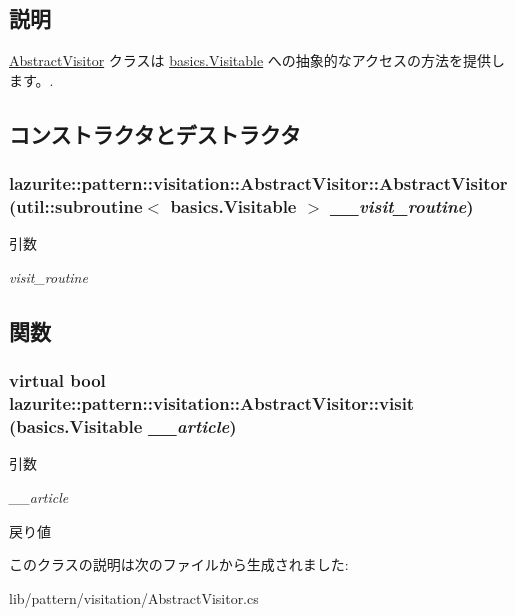 \subsection{説明}
\hyperlink{classlazurite_1_1pattern_1_1visitation_1_1_abstract_visitor}{AbstractVisitor} クラスは \hyperlink{interfacelazurite_1_1pattern_1_1basics_1_1_visitable}{basics.Visitable} への抽象的なアクセスの方法を提供します。. 

\subsection{コンストラクタとデストラクタ}
\hypertarget{classlazurite_1_1pattern_1_1visitation_1_1_abstract_visitor_afaf79739e852e350b1860ca72323355f}{
\subsubsection[{AbstractVisitor}]{\setlength{\rightskip}{0pt plus 5cm}lazurite::pattern::visitation::AbstractVisitor::AbstractVisitor (util::subroutine$<$ {\bf basics.Visitable} $>$ {\em \_\-\_\-visit\_\-routine})}}
\label{classlazurite_1_1pattern_1_1visitation_1_1_abstract_visitor_afaf79739e852e350b1860ca72323355f}

\begin{DoxyParams}{引数}
\item[{\em visit\_\-routine}]\end{DoxyParams}


\subsection{関数}
\hypertarget{classlazurite_1_1pattern_1_1visitation_1_1_abstract_visitor_ad7b16d1b570a2138249a711c38e7d15f}{
\subsubsection[{visit}]{\setlength{\rightskip}{0pt plus 5cm}virtual bool lazurite::pattern::visitation::AbstractVisitor::visit ({\bf basics.Visitable} {\em \_\-\_\-article})}}
\label{classlazurite_1_1pattern_1_1visitation_1_1_abstract_visitor_ad7b16d1b570a2138249a711c38e7d15f}

\begin{DoxyParams}{引数}
\item[{\em \_\-\_\-article}]\end{DoxyParams}
\begin{DoxyReturn}{戻り値}

\end{DoxyReturn}


このクラスの説明は次のファイルから生成されました:\begin{DoxyCompactItemize}
\item 
lib/pattern/visitation/AbstractVisitor.cs\end{DoxyCompactItemize}
